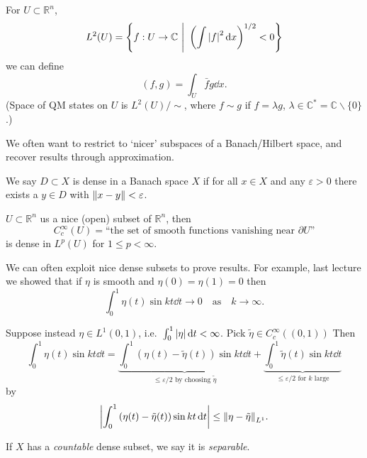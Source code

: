 \documentclass[a4paper,11pt]{article}
\begin{document}
	\begin{ex}
		For $U \subset \mathbb{R}^n$, 
		\[
			L^2(U) = \left\{ f: U \to \mathbb{C}\ \Bigg|\ \left( \int \abs{f}^2 \dd{x} \right)^{1/2} < 0 \right\}
		\]
		we can define
		\[
			(f,g) = \int_U \bar{f} g \dd{x}.
		\]
		(Space of QM states on $U$ is $L^2(U)/\sim$, where $f \sim g$ if $f = \lambda g$, $\lambda \in \mathbb{C}^* = \mathbb{C} \backslash \{0\}$.)
	\end{ex}

	We often want to restrict to `nicer' subspaces of a Banach/Hilbert space, and recover results through approximation.

	We say $D \subset X$ is dense in a Banach space $X$ if for all $x \in X$ and any $\varepsilon > 0$ there exists a $y \in D$ with $\norm{x - y} < \varepsilon$.

	\begin{center}
	\end{center}

	\begin{ex}
		$U \subset \mathbb{R}^n$ us a nice (open) subset of $\mathbb{R}^n$, then 
		\[
			C ^{\infty}_c (U) = \text{``the set of smooth functions vanishing near $\partial U$''}
		\]
		is dense in $L^p(U)$ for $1 \leq p < \infty$.
	\end{ex}

	We can often exploit nice dense subsets to prove results. For example, last lecture we showed that if $\eta$ is smooth and $\eta(0) = \eta(1) = 0$ then
	\[
		\int_{0}^{1} \eta(t) \sin kt \dd{t} \to 0 \quad \text{as} \quad k \to \infty.
	\]

	Suppose instead $\eta \in L^1(0,1)$, i.e.\ $\int_{0}^{1} \abs{\eta} \dd{t} < \infty$. Pick $\tilde \eta \in C ^{\infty}_c ((0,1))$ Then 
	\[
		\int_{0}^{1} \eta(t) \sin kt \dd{t} = \underbrace{\int_{0}^{1} \left( \eta(t) - \tilde \eta(t) \right) \sin kt \dd{t}}_{\leq \varepsilon/2 \text{ by choosing }\tilde \eta} + \underbrace{\int_{0}^{1} \tilde \eta(t) \sin kt \dd{t}}_{\leq \varepsilon/2 \text{ for $k$ large}}
	\]
	by
	\[
		\abs{\int_{0}^{1} \left( \eta(t) - \tilde \eta(t) \right) \sin kt \dd{t}} \leq \norm{\eta - \tilde \eta}_{L^1}.
	\]

	If $X$ has a \emph{countable} dense subset, we say it is \emph{separable}.
\end{document}
